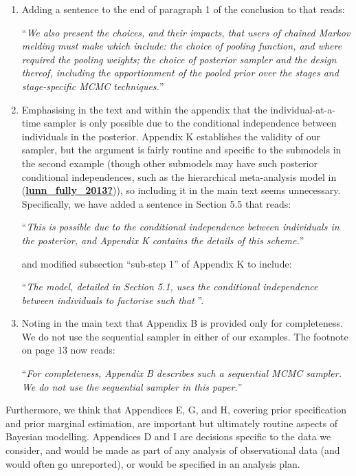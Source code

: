\documentclass[
  10pt,
  a4paper,
]{article}
\begin{document}
\begin{enumerate}
\def\labelenumi{\arabic{enumi}.}
\item
  Adding a sentence to the end of paragraph 1 of the conclusion to that
  reads:

  ``\emph{We also present the choices, and their impacts, that users of
  chained Markov melding must make which include: the choice of pooling
  function, and where required the pooling weights; the choice of
  posterior sampler and the design thereof, including the apportionment
  of the pooled prior over the stages and stage-specific MCMC
  techniques.}''
\item
  Emphasising in the text and within the appendix that the
  individual-at-a-time sampler is only possible due to the conditional
  independence between individuals in the posterior. Appendix K
  establishes the validity of our sampler, but the argument is fairly
  routine and specific to the submodels in the second example (though
  other submodels may have such posterior conditional independences,
  such as the hierarchical meta-analysis model in
  (\protect\hyperlink{ref-lunn_fully_2013}{\textbf{lunn\_fully\_2013?}})),
  so including it in the main text seems unnecessary. Specifically, we
  have added a sentence in Section 5.5 that reads:

  ``\emph{This is possible due to the conditional independence between
  individuals in the posterior, and Appendix K contains the details of
  this scheme.}''

  and modified subsection ``sub-step 1'' of Appendix K to include:

  ``\emph{The model, detailed in Section 5.1, uses the conditional
  independence between individuals to factorise such that
  \textellipsis}''.
\item
  Noting in the main text that Appendix B is provided only for
  completeness. We do not use the sequential sampler in either of our
  examples. The footnote on page 13 now reads:

  ``\emph{For completeness, Appendix B describes such a sequential MCMC
  sampler. We do not use the sequential sampler in this paper.}''
\end{enumerate}

Furthermore, we think that Appendices E, G, and H, covering prior
specification and prior marginal estimation, are important but
ultimately routine aspects of Bayesian modelling. Appendices D and I are
decisions specific to the data we consider, and would be made as part of
any analysis of observational data (and would often go unreported), or
would be specified in an analysis plan.
\end{document}
